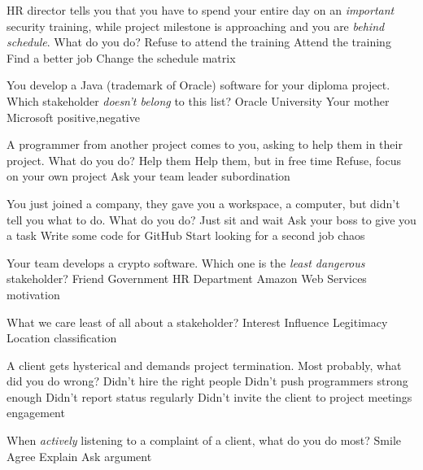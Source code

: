\documentclass{article}
\begin{document}

\pmbaQuestion
  {HR director tells you that you have to spend your entire day on an \emph{important} security training, while project milestone is approaching and you are \emph{behind schedule}. What do you do?}
  {Refuse to attend the training}
  {Attend the training}
  {Find a better job}
  {Change the schedule}
  {matrix}

\pmbaQuestion
  {You develop a Java (trademark of Oracle) software for your diploma project. Which stakeholder \emph{doesn't belong} to this list?}
  {Oracle}
  {University}
  {Your mother}
  {Microsoft}
  {positive,negative}

\pmbaQuestion
  {A programmer from another project comes to you, asking to help them in their project. What do you do?}
  {Help them}
  {Help them, but in free time}
  {Refuse, focus on your own project}
  {Ask your team leader}
  {subordination}

\pmbaQuestion
  {You just joined a company, they gave you a workspace, a computer, but didn't tell you what to do. What do you do?}
  {Just sit and wait}
  {Ask your boss to give you a task}
  {Write some code for GitHub}
  {Start looking for a second job}
  {chaos}

\pmbaQuestion
  {Your team develops a crypto software. Which one is the \emph{least dangerous} stakeholder?}
  {Friend}
  {Government}
  {HR Department}
  {Amazon Web Services}
  {motivation}

\pmbaQuestion
  {What we care least of all about a stakeholder?}
  {Interest}
  {Influence}
  {Legitimacy}
  {Location}
  {classification}

\pmbaQuestion
  {A client gets hysterical and demands project termination. Most probably, what did you do wrong?}
  {Didn't hire the right people}
  {Didn't push programmers strong enough}
  {Didn't report status regularly}
  {Didn't invite the client to project meetings}
  {engagement}

\pmbaQuestion
  {When \emph{actively} listening to a complaint of a client, what do you do most?}
  {Smile}
  {Agree}
  {Explain}
  {Ask}
  {argument}


\end{document}
